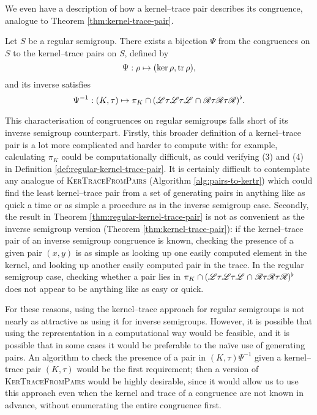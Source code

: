 We even have a description of how a kernel--trace pair describes its congruence,
analogue to Theorem \ref{thm:kernel-trace-pair}.

\begin{theorem}
  \label{thm:regular-kernel-trace-pair}
  Let $S$ be a regular semigroup.  There exists a bijection $\Psi$ from the
  congruences on $S$ to the kernel--trace pairs on $S$, defined by
  $$\Psi: \rho \mapsto (\ker\rho, \operatorname{tr}\rho),$$
  and its inverse satisfies
  $$\Psi^{-1} : (K,\tau) \mapsto \pi_K \cap
  (\mathrel{\mathscr{L}}\mathrel{\tau}\mathrel{\mathscr{L}}\mathrel{\tau}\mathrel{\mathscr{L}} \cap
  \mathrel{\mathscr{R}}\mathrel{\tau}\mathrel{\mathscr{R}}\mathrel{\tau}\mathrel{\mathscr{R}})^\flat.$$
\end{theorem}

This characterisation of congruences on regular semigroups falls short of its
inverse semigroup counterpart.  Firstly, this broader definition of a
kernel--trace pair is a lot more complicated and harder to compute with: for
example, calculating $\pi_K$ could be computationally difficult, as could
verifying (3) and (4) in Definition \ref{def:regular-kernel-trace-pair}.  It is
certainly difficult to contemplate any analogue of \textsc{KerTraceFromPairs}
(Algorithm \ref{alg:pairs-to-kertr}) which could find the least kernel--trace
pair from a set of generating pairs in anything like as quick a time or as
simple a procedure as in the inverse semigroup case.  Secondly, the result in
Theorem \ref{thm:regular-kernel-trace-pair} is not as convenient as the inverse
semigroup version (Theorem \ref{thm:kernel-trace-pair}): if the kernel--trace
pair of an inverse semigroup congruence is known, checking the presence of a
given pair $(x,y)$ is as simple as looking up one easily computed element in the
kernel, and looking up another easily computed pair in the trace.  In the
regular semigroup case, checking whether a pair lies in
$\pi_K \cap (\mathrel{\mathscr{L}}\mathrel{\tau}\mathrel{\mathscr{L}}\mathrel{\tau}\mathrel{\mathscr{L}} \cap
\mathrel{\mathscr{R}}\mathrel{\tau}\mathrel{\mathscr{R}}\mathrel{\tau}\mathrel{\mathscr{R}})^\flat$ does not appear to be anything
like as easy or quick.

For these reasons, using the kernel--trace approach for regular semigroups is not
nearly as attractive as using it for inverse semigroups.  However, it is
possible that using the representation in a computational way would be feasible,
and it is possible that in some cases it would be preferable to the na\"{i}ve
use of generating pairs.  An algorithm to check the presence of a pair in
$(K,\tau)\Psi^{-1}$ given a kernel--trace pair $(K,\tau)$ would be the first
requirement; then a version of \textsc{KerTraceFromPairs} would be highly
desirable, since it would allow us to use this approach even when the kernel and
trace of a congruence are not known in advance, without enumerating the entire
congruence first.
